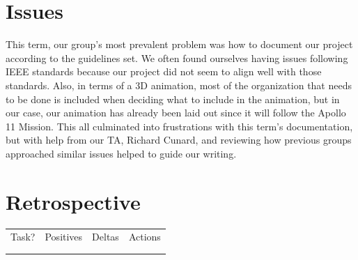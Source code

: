 \documentclass[onecolumn, draftclsnofoot,10pt, compsoc]{IEEEtran}
\begin{document}
\section{Issues}
This term, our group's most prevalent problem was how to document our project according to the guidelines set. We often found ourselves having issues following IEEE standards because our project did not seem to align well with those standards. Also, in terms of a 3D animation, most of the organization that needs to be done is included when deciding what to include in the animation, but in our case, our animation has already been laid out since it will follow the Apollo 11 Mission. This all culminated into frustrations with this term's documentation, but with help from our TA, Richard Cunard, and reviewing how previous groups approached similar issues helped to guide our writing. 

\section{Retrospective}

\begin{tabular}{|l|l|l|l|}
\hline
    Task? & Positives & Deltas & Actions  \\
     & & & \\
     & & & \\
    \hline
     
\end{tabular}
\end{document}
